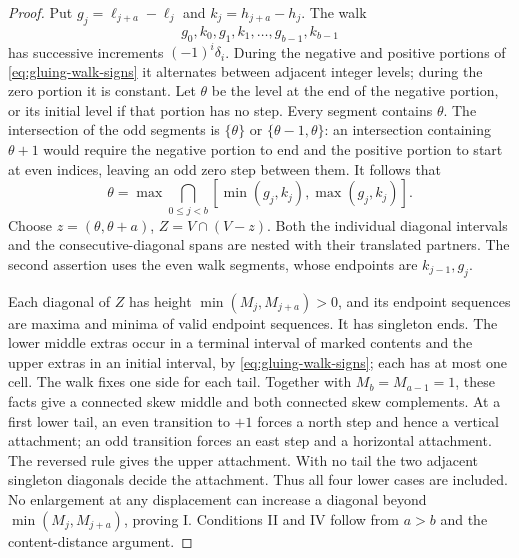 \documentclass[11pt,a4paper]{amsart}
\numberwithin{equation}{section}
\theoremstyle{plain}
\theoremstyle{definition}
\begin{document}
\begin{proof}
Put \(g_j=\ell_{j+a}-\ell_j\) and \(k_j=h_{j+a}-h_j\).  The walk
\begin{equation*}
 g_0,k_0,g_1,k_1,\ldots,g_{b-1},k_{b-1}
\end{equation*}
has successive increments \((-1)^i\delta_i\).  During the negative and positive portions of \eqref{eq:gluing-walk-signs} it alternates between adjacent integer levels; during the zero portion it is constant.  Let \(\theta\) be the level at the end of the negative portion, or its initial level if that portion has no step.  Every segment contains \(\theta\).  The intersection of the odd segments is \(\{\theta\}\) or \(\{\theta-1,\theta\}\): an intersection containing \(\theta+1\) would require the negative portion to end and the positive portion to start at even indices, leaving an odd zero step between them.  It follows that
\begin{equation*}
 \theta=\max\bigcap_{0\le j<b}[\min(g_j,k_j),\max(g_j,k_j)].
\end{equation*}
Choose \(z=(\theta,\theta+a)\), \(Z=V\cap(V-z)\).  Both the individual diagonal intervals and the consecutive-diagonal spans are nested with their translated partners.  The second assertion uses the even walk segments, whose endpoints are \(k_{j-1},g_j\).

Each diagonal of \(Z\) has height \(\min(M_j,M_{j+a})>0\), and its endpoint sequences are maxima and minima of valid endpoint sequences.  It has singleton ends.  The lower middle extras occur in a terminal interval of marked contents and the upper extras in an initial interval, by \eqref{eq:gluing-walk-signs}; each has at most one cell.  The walk fixes one side for each tail.  Together with \(M_b=M_{a-1}=1\), these facts give a connected skew middle and both connected skew complements.  At a first lower tail, an even transition to \(+1\) forces a north step and hence a vertical attachment; an odd transition forces an east step and a horizontal attachment.  The reversed rule gives the upper attachment.  With no tail the two adjacent singleton diagonals decide the attachment.  Thus all four lower cases are included.  No enlargement at any displacement can increase a diagonal beyond \(\min(M_j,M_{j+a})\), proving I.  Conditions II and IV follow from \(a>b\) and the content-distance argument.


\end{proof}
\end{document}

